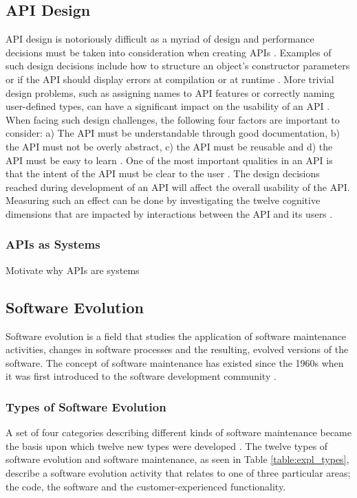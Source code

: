 \documentclass{sig-alternate}
\begin{document}
\subsection{API Design} \label{api_design}
API design is notoriously difficult as a myriad of design and performance decisions must be taken into consideration when creating APIs \cite{afonso2012evaluating, bloch2008effective, stylos2006comparing}. Examples of such design decisions include how to structure an object's constructor parameters or if the API should display errors at compilation or at runtime \cite{stylos2006comparing}. More trivial design problems, such as assigning names to API features or correctly naming user-defined types, can have a significant impact on the usability of an API \cite{shi2011empirical}. When facing such design challenges, the following four factors are important to consider: a) The API must be understandable through good documentation, b) the API must not be overly abstract, c) the API must be reusable and d) the API must be easy to learn \cite{shi2011empirical}. One of the most important qualities in an API is that the intent of the API must be clear to the user \cite{shi2011empirical, stylos2006comparing}. The design decisions reached during development of an API will affect the overall usability of the API. Measuring such an effect can be done by investigating the twelve cognitive dimensions that are impacted by interactions between the API and its users \cite{clarke2004measuring}. 

\subsubsection{APIs as Systems}
Motivate why APIs are systems

\subsection{Software Evolution} \label{software_evolution}
Software evolution is a field that studies the application of software maintenance activities, changes in software processes and the resulting, evolved versions of the software. The concept of software maintenance has existed since the 1960s when it was first introduced to the software development community \cite{lientz1980software}. 

\subsubsection{Types of Software Evolution}
A set of four categories describing different kinds of software maintenance \cite{lientz1980software} became the basis upon which twelve new types were developed \cite{chapin2001types}. The twelve types of software evolution and software maintenance, as seen in Table \ref{table:expl_types}, describe a software evolution activity that relates to one of three particular areas; the code, the software and the customer-experienced functionality. 
\end{document}
